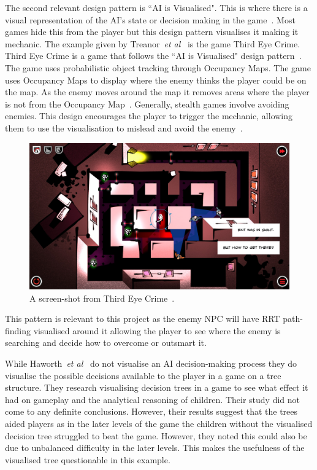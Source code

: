 \documentclass[journal]{IEEEtran}
\begin{document}
	The second relevant design pattern is ``AI is Visualised".  This is where there is a visual representation of the AI's state or decision making in the game~\cite{treanor2015}. Most games hide this from the player but this design pattern visualises it making it mechanic.  
	The example given by Treanor~\textit{et al}~\cite{treanor2015} is the game Third Eye Crime.  Third Eye Crime is a game that follows the ``AI is Visualised" design pattern~\cite{Isla2014, game:ThirdEyeCrime}. The game uses probabilistic object tracking through Occupancy Maps. The game uses Occupancy Maps to display where the enemy thinks the player could be on the map. As the enemy moves around the map it removes areas where the player is not from the Occupancy Map~\cite{Isla2014}.  Generally, stealth games involve avoiding enemies.  This design encourages the player to trigger the mechanic, allowing them to use the visualisation to mislead and avoid the enemy~\cite{Isla2014, game:ThirdEyeCrime}. 
	
	\begin{figure}[h]
		\includegraphics[width=1.0\linewidth]{ThirdEyeCrime.jpg}
		\caption{ A screen-shot from Third Eye Crime~\cite{game:ThirdEyeCrime}.}
		\label{image:ThirdEyeCrime}
	\end{figure}  
	
	This pattern is relevant to this project as the enemy NPC will have RRT path-finding visualised around it allowing the player to see where the enemy is searching and decide how to overcome or outsmart it.
	
	While Haworth~\textit{et al}~\cite{Haworth2010} do not visualise an AI decision-making process they do visualise the possible decisions available to the player in a game on a tree structure.   They research visualising decision trees in a game to see what effect it had on gameplay and the analytical reasoning of children.  
	Their study did not come to any definite conclusions. However, their results suggest that the trees aided players as in the later levels of the game the children without the visualised decision tree struggled to beat the game. However, they noted this could also be due to unbalanced difficulty in the later levels. This makes the usefulness of the visualised tree questionable in this example.  
	
\end{document}
